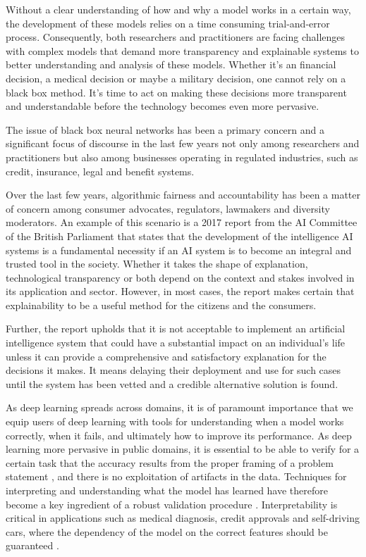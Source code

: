 Without a clear understanding of how and why a model works in a certain way, the development of these models relies on a time consuming trial-and-error process. Consequently, both researchers and practitioners are facing challenges with complex models that demand more transparency and explainable systems to better understanding and analysis of these models. Whether it's an financial decision, a medical decision or maybe a military decision, one cannot rely on a black box method. It's time to act on making these decisions more transparent and understandable before the technology becomes even more pervasive.

The issue of black box neural networks has been a primary concern and a significant focus of discourse in the last few years not only among researchers and practitioners \cite{Samek} but also among businesses operating in regulated industries, such as credit, insurance, legal and benefit systems. 

Over the last few years, algorithmic fairness and accountability has been a matter of concern among consumer advocates, regulators, lawmakers and diversity moderators. An example of this scenario is a 2017 report from the AI Committee of the British Parliament \cite{Hagras2018} that states that the development of the intelligence AI systems is a fundamental necessity if an AI system is to become an integral and trusted tool in the society. Whether it takes the shape of explanation, technological transparency or both depend on the context and stakes involved in its application and sector. However, in most cases, the report makes certain that explainability to be a useful method for the citizens and the consumers. 

Further, the report upholds that it is not acceptable to implement an artificial intelligence system that could have a substantial impact on an individual's life unless it can provide a comprehensive and satisfactory explanation for the decisions it makes. It means delaying their deployment and use for such cases until the system has been vetted and a credible alternative solution is found.

As deep learning spreads across domains, it is of paramount importance that we equip users of deep learning with tools for understanding when a model works correctly, when it fails, and ultimately how to improve its performance. As deep learning more pervasive in public domains, it is essential to be able to verify for a certain task that the accuracy results from the proper framing of a problem statement \cite{Liu2017}, and there is no exploitation of artifacts in the data. Techniques for interpreting and understanding what the model has learned have therefore become a key ingredient of a robust validation procedure \cite{taylor2006methods} \cite{hansen2011visual} \cite{bach2015pixel}. Interpretability is critical in applications such as medical diagnosis, credit approvals and self-driving cars, where the dependency of the model on the correct features should be guaranteed \cite{Caruana:2015:IMH:2783258.2788613} \cite{bojarski2017explaining}.

